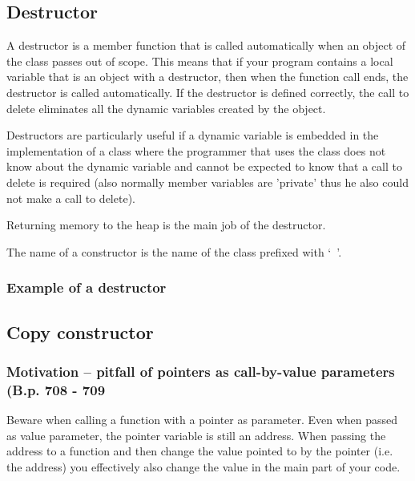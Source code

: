 \subsection{Destructor}
A destructor is a member function that is called automatically when an object of the class
passes out of scope. This means that if your program contains a local variable that is an
object with a destructor, then when the function call ends, the destructor is called automatically.
If the destructor is defined correctly, the call to delete eliminates all the dynamic variables created
by the object.

Destructors are particularly useful if a dynamic variable is embedded in the implementation of a
class where the programmer that uses the class does not know about the dynamic variable
and cannot be expected to know that a call to delete is required (also normally member variables
are 'private' thus he also could not make a call to delete).

Returning memory to the heap is the main job of the destructor.

The name of a constructor is the name of the class prefixed with `~'.

\subsubsection*{Example of a destructor}




\subsection{Copy constructor}

\subsubsection*{Motivation -- pitfall of pointers as call-by-value parameters (B.p. 708 - 709}
Beware when calling a function with a pointer as parameter. Even when passed as value
parameter, the pointer variable is still an address. When passing the address to a function
and then change the value pointed to by the pointer (i.e. the address) you effectively also
change the value in the main part of your code.

